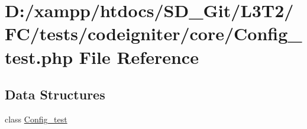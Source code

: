 \hypertarget{_config__test_8php}{}\section{D\+:/xampp/htdocs/\+S\+D\+\_\+\+Git/\+L3\+T2/\+F\+C/tests/codeigniter/core/\+Config\+\_\+test.php File Reference}
\label{_config__test_8php}
\subsection*{Data Structures}
\begin{DoxyCompactItemize}
\item 
class \hyperlink{class_config__test}{Config\+\_\+test}
\end{DoxyCompactItemize}
